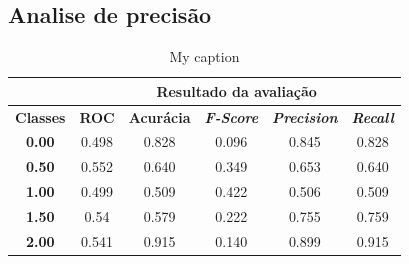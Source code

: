 \subsection{Analise de precisão}

\begin{table}[]
\centering
\begin{tabular}{c|c|c|c|c|c|}
\cline{2-6}
 & \multicolumn{5}{c|}{\textbf{Resultado da avaliação}} \\ \hline
\multicolumn{1}{|c|}{\textbf{Classes}} & \textbf{ROC} & \textbf{Acurácia} & \textit{\textbf{F-Score}} & \textit{\textbf{Precision}} & \textit{\textbf{Recall}} \\ \hline
\multicolumn{1}{|c|}{\textbf{0.00}} & 0.498 & 0.828 & 0.096 & 0.845 & 0.828 \\ \hline
\multicolumn{1}{|c|}{\textbf{0.50}} & 0.552 & 0.640 & 0.349 & 0.653 & 0.640 \\ \hline
\multicolumn{1}{|c|}{\textbf{1.00}} & 0.499 & 0.509 & 0.422 & 0.506 & 0.509 \\ \hline
\multicolumn{1}{|c|}{\textbf{1.50}} & 0.54 & 0.579 & 0.222 & 0.755 & 0.759 \\ \hline
\multicolumn{1}{|c|}{\textbf{2.00}} & 0.541 & 0.915 & 0.140 & 0.899 & 0.915 \\ \hline
\end{tabular}
\caption{My caption}
\label{my-label}
\end{table}

